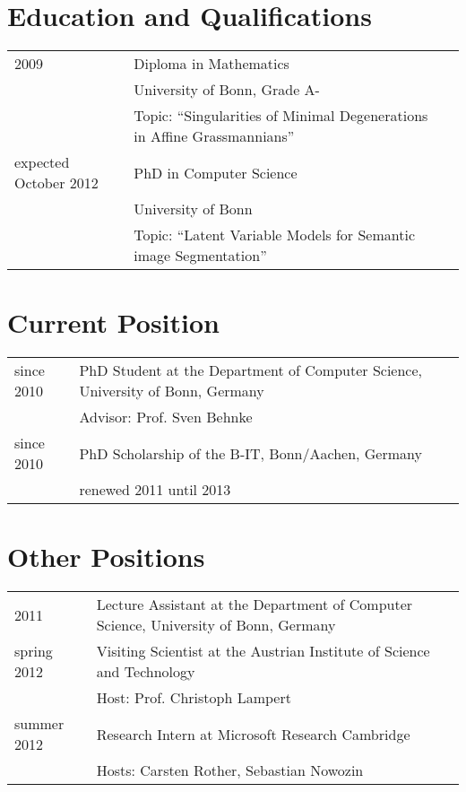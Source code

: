 \documentclass[a4paper,11pt]{article}
\begin{document}
\maketitle

\section{Education and Qualifications}
\begin{tabular}{lll}
    2009 & Diploma in Mathematics \\ & University of Bonn, Grade A-\\
         & Topic: ``Singularities of Minimal Degenerations in Affine Grassmannians'' \\
    expected October 2012 & PhD in Computer Science \\ & University of Bonn \\
         & Topic: ``Latent Variable Models for Semantic image Segmentation''
\end{tabular}

\section{Current Position}
\begin{tabular}{lll}
    since 2010 & PhD Student at the Department of Computer Science, University of Bonn, Germany\\
               & Advisor: Prof. Sven Behnke\\
    since 2010 & PhD Scholarship of the B-IT, Bonn/Aachen, Germany\\
               & renewed 2011 until 2013\\
\end{tabular}

\section{Other Positions}
\begin{tabular}{lll}
    2011 & Lecture Assistant at the Department of Computer Science, University of Bonn, Germany \\
    spring 2012 & Visiting Scientist at the Austrian Institute of Science and Technology\\
               & Host: Prof. Christoph Lampert\\
    summer 2012 & Research Intern at Microsoft Research Cambridge\\
               & Hosts: Carsten Rother, Sebastian Nowozin\\
\end{tabular}
\end{document}
